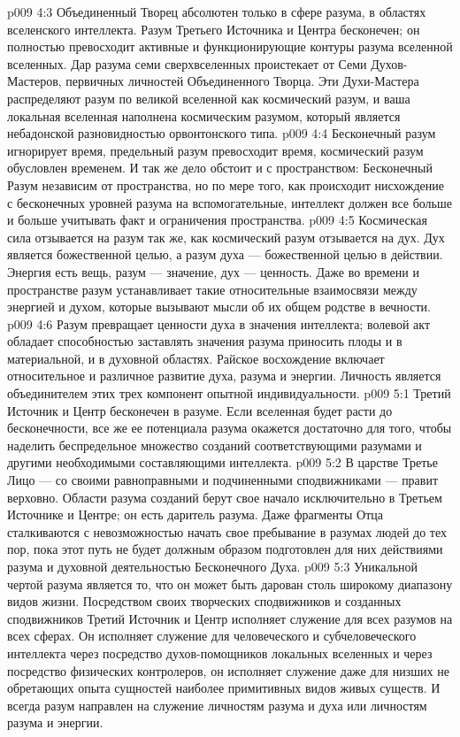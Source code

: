 \vs p009 4:3 \pc Объединенный Творец абсолютен только в сфере разума, в областях вселенского интеллекта. Разум Третьего Источника и Центра бесконечен; он полностью превосходит активные и функционирующие контуры разума вселенной вселенных. Дар разума семи сверхвселенных проистекает от Семи Духов\hyp{}Мастеров, первичных личностей Объединенного Творца. Эти Духи\hyp{}Мастера распределяют разум по великой вселенной как космический разум, и ваша локальная вселенная наполнена космическим разумом, который является небадонской разновидностью орвонтонского типа.
\vs p009 4:4 Бесконечный разум игнорирует время, предельный разум превосходит время, космический разум обусловлен временем. И так же дело обстоит и с пространством: Бесконечный Разум независим от пространства, но по мере того, как происходит нисхождение с бесконечных уровней разума на вспомогательные, интеллект должен все больше и больше учитывать факт и ограничения пространства.
\vs p009 4:5 \pc Космическая сила отзывается на разум так же, как космический разум отзывается на дух. Дух является божественной целью, а разум духа --- божественной целью в действии. Энергия есть вещь, разум --- значение, дух --- ценность. Даже во времени и пространстве разум устанавливает такие относительные взаимосвязи между энергией и духом, которые вызывают мысли об их общем родстве в вечности.
\vs p009 4:6 Разум превращает ценности духа в значения интеллекта; волевой акт обладает способностью заставлять значения разума приносить плоды и в материальной, и в духовной областях. Райское восхождение включает относительное и различное развитие духа, разума и энергии. Личность является объединителем этих трех компонент опытной индивидуальности.
\vs p009 5:1 Третий Источник и Центр бесконечен в разуме. Если вселенная будет расти до бесконечности, все же ее потенциала разума окажется достаточно для того, чтобы наделить беспредельное множество созданий соответствующими разумами и другими необходимыми составляющими интеллекта.
\vs p009 5:2 В царстве  Третье Лицо --- со своими равноправными и подчиненными сподвижниками --- правит верховно. Области разума созданий берут свое начало исключительно в Третьем Источнике и Центре; он есть даритель разума. Даже фрагменты Отца сталкиваются с невозможностью начать свое пребывание в разумах людей до тех пор, пока этот путь не будет должным образом подготовлен для них действиями разума и духовной деятельностью Бесконечного Духа.
\vs p009 5:3 Уникальной чертой разума является то, что он может быть дарован столь широкому диапазону видов жизни. Посредством своих творческих сподвижников и созданных сподвижников Третий Источник и Центр исполняет служение для всех разумов на всех сферах. Он исполняет служение для человеческого и субчеловеческого интеллекта через посредство духов\hyp{}помощников локальных вселенных и через посредство физических контролеров, он исполняет служение даже для низших не обретающих опыта сущностей наиболее примитивных видов живых существ. И всегда разум направлен на служение личностям разума и духа или личностям разума и энергии.
